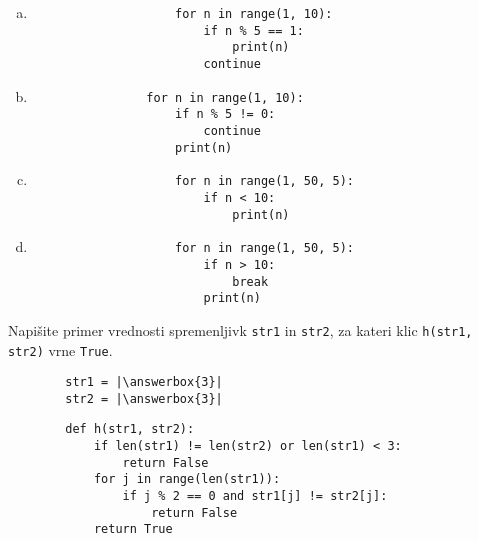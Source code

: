 \documentclass[arhiv, 10pt]{../izpit}
\newcommand{\inlinepy}[1]{\texttt{#1}}
\newcommand{\answerbox}[1]{\framebox{\vphantom{\large M}\hspace{#1cm}}}
\begin{document}
        \begin{multicols}{2}
        \begin{enumerate}[(a)]
\item 
                \begin{verbatim}
                    for n in range(1, 10):
                        if n % 5 == 1:
                            print(n)
                        continue
                \end{verbatim}
            
\item 
            \begin{verbatim}
                for n in range(1, 10):
                    if n % 5 != 0:
                        continue
                    print(n)
            \end{verbatim}
        
\item 
                \begin{verbatim}
                    for n in range(1, 50, 5):
                        if n < 10:
                            print(n)
                \end{verbatim}
            
\item 
                \begin{verbatim}
                    for n in range(1, 50, 5):
                        if n > 10:
                            break
                        print(n)
                \end{verbatim}
            
\end{enumerate}

        \end{multicols}
    
        \naloga*
        \begin{multicols}{2}
        \noindent
        Napišite primer vrednosti spremenljivk \inlinepy{str1} in \inlinepy{str2}, za kateri klic \inlinepy{h(str1, str2)} vrne \inlinepy{True}.
        \begin{verbatim}
        str1 = |\answerbox{3}|
        str2 = |\answerbox{3}|
        \end{verbatim}
        \vfil
        \columnbreak
        \begin{verbatim}
        def h(str1, str2):
            if len(str1) != len(str2) or len(str1) < 3:
                return False
            for j in range(len(str1)):
                if j % 2 == 0 and str1[j] != str2[j]:
                    return False
            return True
        \end{verbatim}
        \end{multicols}
    
\end{document}
